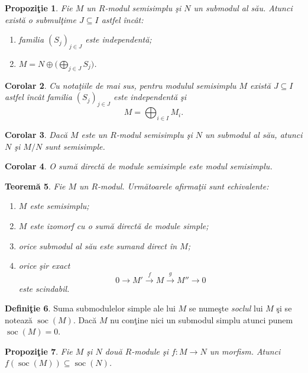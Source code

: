 \documentclass[12pt,a4paper]{book}
\DeclareMathOperator{\soc}{soc}
\theoremstyle{plain}
\newtheorem{theorem}{Teoremă}[section] %
\newtheorem{proposition}[theorem]{Propoziţie}
\newtheorem{corollary}[theorem]{Corolar}
\theoremstyle{definition}
\newtheorem{definition}[theorem]{Definiţie}
\theoremstyle{remark}
\begin{document}
\begin{proposition}
Fie \(M\) un \(R\)-modul semisimplu şi \(N\) un submodul al său.
Atunci există o submulţime \(J \subseteq I\) astfel încât:
\begin{enumerate}
  \item familia \((S_j)_{j\in J}\) este independentă;
  \item \(M = N \oplus \bigl(\bigoplus_{j\in J} S_j\bigr)\).
\end{enumerate}
\end{proposition}

\begin{corollary}
Cu notaţiile de mai sus, pentru modulul semisimplu \(M\) există \(J \subseteq I\) astfel încât
familia \((S_j)_{j\in J}\) este independentă şi
\[
  M = \bigoplus_{i\in I} M_i.
\]
\end{corollary}

\begin{corollary}
Dacă \(M\) este un \(R\)-modul semisimplu şi \(N\) un submodul al său, atunci \(N\) şi
\(M/N\) sunt semisimple.
\end{corollary}

\begin{corollary}
O sumă directă de module semisimple este modul semisimplu.
\end{corollary}

\begin{theorem}
Fie \(M\) un \(R\)-modul. Următoarele afirmaţii sunt echivalente:
\begin{enumerate}
  \item \(M\) este semisimplu;
  \item \(M\) este izomorf cu o sumă directă de module simple;
  \item orice submodul al său este sumand direct în \(M\);
  \item orice şir exact
  \[
    0 \longrightarrow M' \xrightarrow{\,f\,} M \xrightarrow{\,g\,} M'' \longrightarrow 0
  \]
  este scindabil.
\end{enumerate}
\end{theorem}

\begin{definition}
Suma submodulelor simple ale lui \(M\) se numeşte \emph{soclul} lui \(M\) şi se notează
\(\soc(M)\). Dacă \(M\) nu conţine nici un submodul simplu atunci punem \(\soc(M) = 0\).
\end{definition}

\begin{proposition}
Fie \(M\) şi \(N\) două \(R\)-module şi \(f\colon M \to N\) un morfism.
Atunci \(f(\soc(M)) \subseteq \soc(N)\).
\end{proposition}
\end{document}
